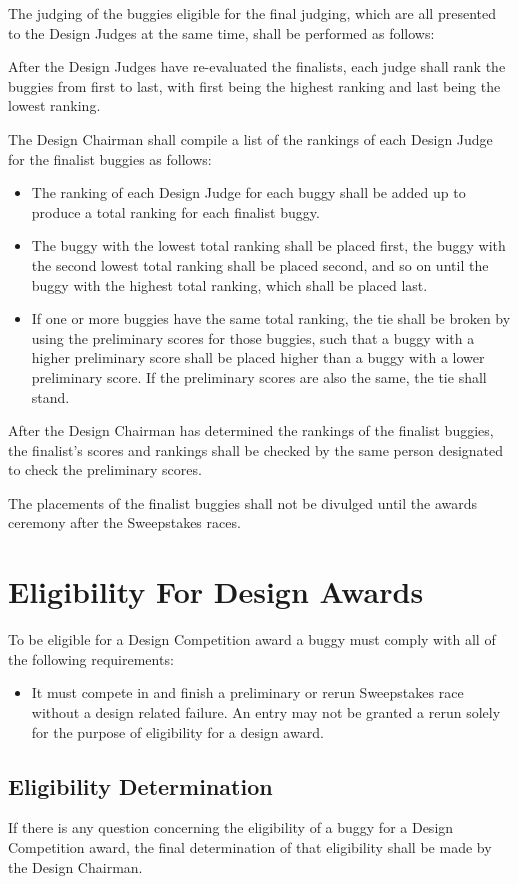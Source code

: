 	The judging of the buggies eligible for the final judging, which are all presented to the Design Judges at the same time, shall be performed as follows:

	After the Design Judges have re-evaluated the finalists, each judge shall rank the buggies from first to last, with first being the highest ranking and last being the lowest ranking.

	The Design Chairman shall compile a list of the rankings of each Design Judge for the finalist buggies as follows:
	\newline

	\begin{itemize}

		\item
		The ranking of each Design Judge for each buggy shall be added up to produce a total ranking for each finalist buggy.

		\item
		The buggy with the lowest total ranking shall be placed first, the buggy with the second lowest total ranking shall be placed second, and so on until the buggy with the highest total ranking, which shall be placed last.

		\item
		If one or more buggies have the same total ranking, the tie shall be broken by using the preliminary scores for those buggies, such that a buggy with a higher preliminary score shall be placed higher than a buggy with a lower preliminary score. If the preliminary scores are also the same, the tie shall stand.

	\end{itemize}	

	After the Design Chairman has determined the rankings of the finalist buggies, the finalist's scores and rankings shall be checked by the same person designated to check the preliminary scores.

	The placements of the finalist buggies shall not be divulged until the awards ceremony after the Sweepstakes races.

\section{Eligibility For Design Awards}

	To be eligible for a Design Competition award a buggy must comply with all of the following requirements:
	\newline

	\begin{itemize}
		\item It must compete in and finish a preliminary or rerun Sweepstakes race without a design related failure. An entry may not be granted a rerun solely for the purpose of eligibility for a design award.
	\end{itemize}

\subsection{Eligibility Determination}

	If there is any question concerning the eligibility of a buggy for a Design Competition award, the final determination of that eligibility shall be made by the Design Chairman.


